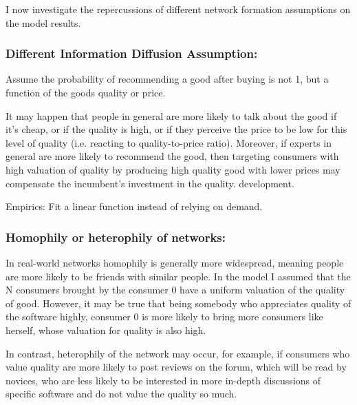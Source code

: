 \documentclass{article}
\numberwithin{figure}{section}
\numberwithin{table}{section}
\theoremstyle{indented}
\numberwithin{equation}{section} %
\begin{document}



I now investigate the repercussions of different network formation assumptions on the model results.
 \subsubsection{Different Information Diffusion Assumption:}

    Assume the probability of recommending a good after buying is not 1, but a function of the goods quality or price.
    
    It may happen that people in general are more likely to talk about the good if it's cheap, or if the quality is high, or if they perceive the price to be low for this level of quality (i.e. reacting to quality-to-price ratio). Moreover, if experts in general are more likely to recommend the good, then targeting consumers with high valuation of quality by producing high quality good with lower prices may compensate the incumbent's investment in the quality. development.
    
    Empirics:  Fit a linear function instead of relying on demand.
    
    \subsubsection{Homophily or heterophily of networks:}
    
    In real-world networks homophily is generally more widespread, meaning people are more likely to be friends with similar people. In the model I assumed that the N consumers brought by the consumer 0 have a uniform valuation of the quality of good. However, it may be true that being somebody who appreciates quality of the software highly, consumer 0 is more likely to bring more consumers like herself, whose valuation for quality is also high.
    
    In contrast, heterophily of the network may occur, for example, if consumers who value quality are more likely to post reviews on the forum, which will be read by novices, who are less likely to be interested in more in-depth discussions of specific software and do not value the quality so much.
    
\end{document}
